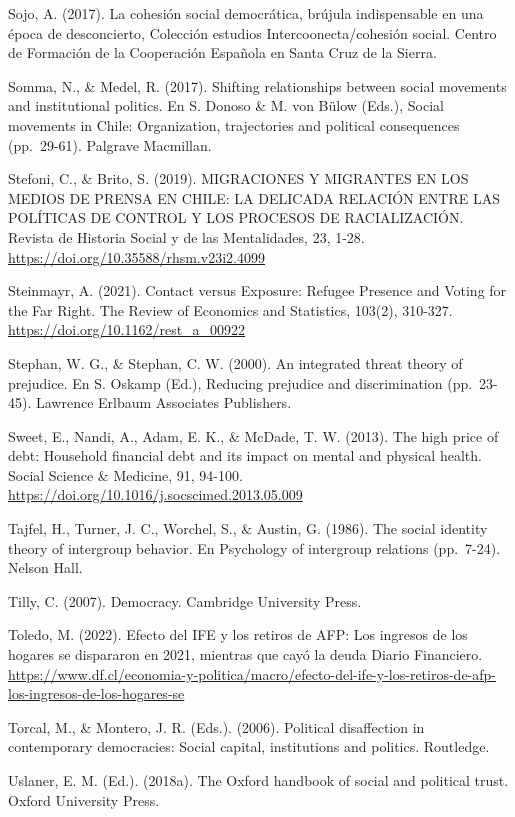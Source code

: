 \documentclass[
  12pt,
]{book}
\begin{document}
Sojo, A. (2017). La cohesión social democrática, brújula indispensable en una época de desconcierto, Colección estudios Intercoonecta/cohesión social. Centro de Formación de la Cooperación Española en Santa Cruz de la Sierra.

Somma, N., \& Medel, R. (2017). Shifting relationships between social movements and institutional politics. En S. Donoso \& M. von Bülow (Eds.), Social movements in Chile: Organization, trajectories and political consequences (pp.~29-61). Palgrave Macmillan.

Stefoni, C., \& Brito, S. (2019). MIGRACIONES Y MIGRANTES EN LOS MEDIOS DE PRENSA EN CHILE: LA DELICADA RELACIÓN ENTRE LAS POLÍTICAS DE CONTROL Y LOS PROCESOS DE RACIALIZACIÓN. Revista de Historia Social y de las Mentalidades, 23, 1-28. \url{https://doi.org/10.35588/rhsm.v23i2.4099}

Steinmayr, A. (2021). Contact versus Exposure: Refugee Presence and Voting for the Far Right. The Review of Economics and Statistics, 103(2), 310-327. \url{https://doi.org/10.1162/rest_a_00922}

Stephan, W. G., \& Stephan, C. W. (2000). An integrated threat theory of prejudice. En S. Oskamp (Ed.), Reducing prejudice and discrimination (pp.~23-45). Lawrence Erlbaum Associates Publishers.

Sweet, E., Nandi, A., Adam, E. K., \& McDade, T. W. (2013). The high price of debt: Household financial debt and its impact on mental and physical health. Social Science \& Medicine, 91, 94-100. \url{https://doi.org/10.1016/j.socscimed.2013.05.009}

Tajfel, H., Turner, J. C., Worchel, S., \& Austin, G. (1986). The social identity theory of intergroup behavior. En Psychology of intergroup relations (pp.~7-24). Nelson Hall.

Tilly, C. (2007). Democracy. Cambridge University Press.

Toledo, M. (2022). Efecto del IFE y los retiros de AFP: Los ingresos de los hogares se dispararon en 2021, mientras que cayó la deuda \textbar{} Diario Financiero. \url{https://www.df.cl/economia-y-politica/macro/efecto-del-ife-y-los-retiros-de-afp-los-ingresos-de-los-hogares-se}

Torcal, M., \& Montero, J. R. (Eds.). (2006). Political disaffection in contemporary democracies: Social capital, institutions and politics. Routledge.

Uslaner, E. M. (Ed.). (2018a). The Oxford handbook of social and political trust. Oxford University Press.
\end{document}
